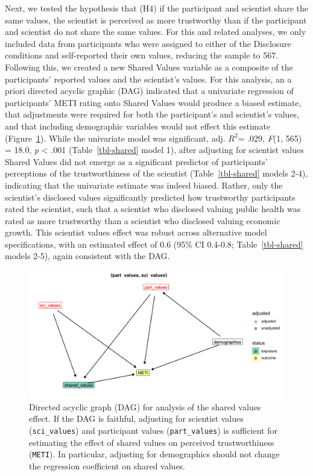 \documentclass[
  letterpaper,
  DIV=11,
  numbers=noendperiod]{scrartcl}
\begin{document}
Next, we tested the hypothesis that (H4) if the participant and
scientist share the same values, the scientist is perceived as more
trustworthy than if the participant and scientist do not share the same
values. For this and related analyses, we only included data from
participants who were assigned to either of the Disclosure conditions
and self-reported their own values, reducing the sample to 567.
Following this, we created a new Shared Values variable as a composite
of the participants' reported values and the scientist's values. For
this analysis, an a priori directed acyclic graphic (DAG) indicated that
a univariate regression of participants' METI rating onto Shared Values
would produce a biased estimate, that adjustments were required for both
the participant's and scientist's values, and that including demographic
variables would not effect this estimate (Figure~\ref{fig-shared-dag}).
While the univariate model was significant, adj. \(R^2\)= .029,
\emph{F}(1, 565) = 18.0, \emph{p} \textless{} .001
(Table~\ref{tbl-shared} model 1), after adjusting for scientist values
Shared Values did not emerge as a significant predictor of participants'
perceptions of the trustworthiness of the scientist
(Table~\ref{tbl-shared} models 2-4), indicating that the univariate
estimate was indeed biased. Rather, only the scientist's disclosed
values significantly predicted how trustworthy participants rated the
scientist, such that a scientist who disclosed valuing public health was
rated as more trustworthy than a scientist who disclosed valuing
economic growth. This scientist values effect was robust across
alternative model specifications, with an estimated effect of 0.6 (95\%
CI 0.4-0.8; Table~\ref{tbl-shared} models 2-5), again consistent with
the DAG.

\begin{figure}

{\centering \includegraphics{fig3_shared_values_dag.png}

}

\caption{\label{fig-shared-dag}Directed acyclic graph (DAG) for analysis
of the shared values effect. If the DAG is faithful, adjusting for
scientist values (\texttt{sci\_values}) and participant values
(\texttt{part\_values}) is sufficient for estimating the effect of
shared values on perceived trustworthiness (\texttt{METI}). In
particular, adjusting for demographics should not change the regression
coefficient on shared values.}

\end{figure}
\end{document}
